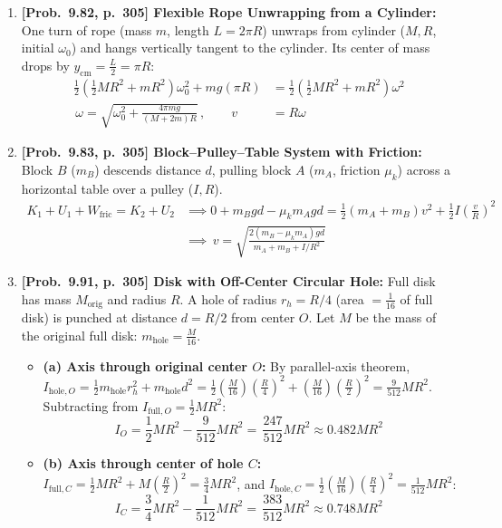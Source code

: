 \documentclass[11pt,a4paper,openany,oneside]{book}
\newcommand{\eqbox}[1]{\boxed{\,#1\,}}
\numberwithin{equation}{chapter}
\begin{document}
\begin{enumerate}[label=\textbf{Prob.\ 9.\arabic*},leftmargin=4.2em]
  \item \textbf{[Prob.\ 9.82, p.\ 305] Flexible Rope Unwrapping from a Cylinder:}
  One turn of rope (mass $m$, length $L = 2\pi R$) unwraps from cylinder ($M, R$, initial $\omega_0$) and hangs vertically tangent to the cylinder. Its center of mass drops by $y_{\text{cm}} = \frac{L}{2} = \pi R$:
  \begin{align*}
    \frac{1}{2}\!\left(\frac{1}{2}MR^2 + mR^2\right)\omega_0^2 + mg(\pi R) &= \frac{1}{2}\!\left(\frac{1}{2}MR^2 + mR^2\right)\omega^2\\
    \eqbox{\omega = \sqrt{\omega_0^2 + \frac{4\pi mg}{(M+2m)R}}}, \qquad v &= R\omega
  \end{align*}

  \item \textbf{[Prob.\ 9.83, p.\ 305] Block--Pulley--Table System with Friction:}
  Block $B$ ($m_B$) descends distance $d$, pulling block $A$ ($m_A$, friction $\mu_k$) across a horizontal table over a pulley ($I, R$).
  \begin{align*}
    K_1 + U_1 + W_{\text{fric}} = K_2 + U_2 &\implies 0 + m_B gd - \mu_k m_A gd = \frac{1}{2}(m_A + m_B)v^2 + \frac{1}{2}I\!\left(\frac{v}{R}\right)^2\\
    &\implies \eqbox{v = \sqrt{\frac{2(m_B - \mu_k m_A)gd}{m_A + m_B + I/R^2}}}
  \end{align*}

  \item \textbf{[Prob.\ 9.91, p.\ 305] Disk with Off-Center Circular Hole:}
  Full disk has mass $M_{\text{orig}}$ and radius $R$. A hole of radius $r_h = R/4$ (area $= \frac{1}{16}$ of full disk) is punched at distance $d = R/2$ from center $O$. Let $M$ be the mass of the original full disk: $m_{\text{hole}} = \frac{M}{16}$.
  \begin{itemize}
    \item \textbf{(a) Axis through original center $O$:} By parallel-axis theorem, $I_{\text{hole},O} = \frac{1}{2}m_{\text{hole}}r_h^2 + m_{\text{hole}}d^2 = \frac{1}{2}\!\left(\frac{M}{16}\right)\!\left(\frac{R}{4}\right)^2 + \left(\frac{M}{16}\right)\!\left(\frac{R}{2}\right)^2 = \frac{9}{512}MR^2$. Subtracting from $I_{\text{full},O} = \frac{1}{2}MR^2$:
    \begin{equation*}
      I_O = \frac{1}{2}MR^2 - \frac{9}{512}MR^2 = \eqbox{\frac{247}{512}MR^2 \approx 0.482MR^2}
    \end{equation*}
    \item \textbf{(b) Axis through center of hole $C$:} $I_{\text{full},C} = \frac{1}{2}MR^2 + M\!\left(\frac{R}{2}\right)^2 = \frac{3}{4}MR^2$, and $I_{\text{hole},C} = \frac{1}{2}\!\left(\frac{M}{16}\right)\!\left(\frac{R}{4}\right)^2 = \frac{1}{512}MR^2$:
    \begin{equation*}
      I_C = \frac{3}{4}MR^2 - \frac{1}{512}MR^2 = \eqbox{\frac{383}{512}MR^2 \approx 0.748MR^2}
    \end{equation*}
  \end{itemize}


\end{enumerate}
\end{document}
